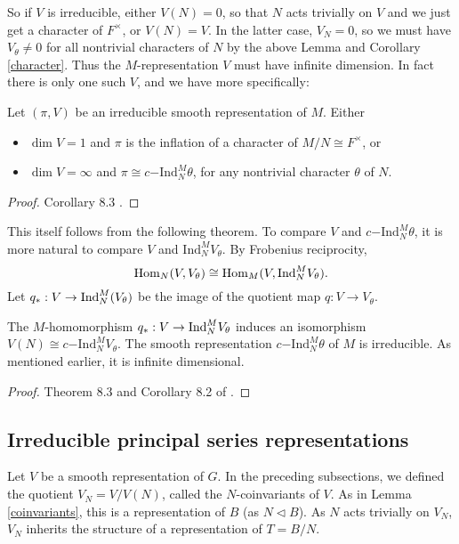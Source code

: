 So if $V$ is irreducible, either $V(N)=0$, so that $N$ acts trivially on $V$ and we just get a character of $F^\times$, or $V(N)=V$. In the latter case, $V_N=0$, so we must have $V_\theta \neq 0$ for all nontrivial characters of $N$ by the above Lemma and Corollary \ref{character}. Thus the $M$-representation $V$ must have infinite dimension. In fact there is only one such $V$, and we have more specifically:

\begin{thm}\label{inf dim}
    Let $(\pi,V)$ be an irreducible smooth representation of $M$. Either 
    \begin{itemize}
        \item $\dim V=1$ and $\pi$ is the inflation of a character of $M/N \cong F^\times$, or
        \item $\dim V = \infty$ and $\pi \cong c\mathrm{-Ind}_N^M \theta$, for any nontrivial character $\theta$ of $N$.
    \end{itemize}
\end{thm}
\begin{proof}
    Corollary 8.3 \cite{BH1}.
\end{proof}

This itself follows from the following theorem. To compare $V$ and $c\mathrm{-Ind}_N^M \theta$, it is more natural to compare $V$ and $\mathrm{Ind}_N^M V_\theta$. By Frobenius reciprocity,
$$\mathrm{Hom}_N(V,V_\theta) \cong \mathrm{Hom}_M(V,\mathrm{Ind}_N^M V_\theta).$$
Let $q_*: V \to \mathrm{Ind}_N^M(V_\theta)$ be the image of the quotient map $q: V \to V_\theta$.

\begin{thm}\label{mirabolic}
    The $M$-homomorphism $q_*: V \to \mathrm{Ind}_N^M V_\theta$ induces an isomorphism $V(N) \cong c\mathrm{-Ind}_N^M V_\theta$. The smooth representation $c\mathrm{-Ind}_N^M \theta$ of $M$ is irreducible. As mentioned earlier, it is infinite dimensional.
\end{thm}
\begin{proof}
    Theorem 8.3 and Corollary 8.2 of \cite{BH1}.
\end{proof}



\subsection{Irreducible principal series representations}

Let $V$ be a smooth representation of $G$. In the preceding subsections, we defined the quotient $V_N =V/V(N)$, called the $N$-coinvariants of $V$. As in Lemma \ref{coinvariants}, this is a representation of $B$ (as $N \lhd B$). As $N$ acts trivially on $V_N$, $V_N$ inherits the structure of a representation of $T=B/N$.


